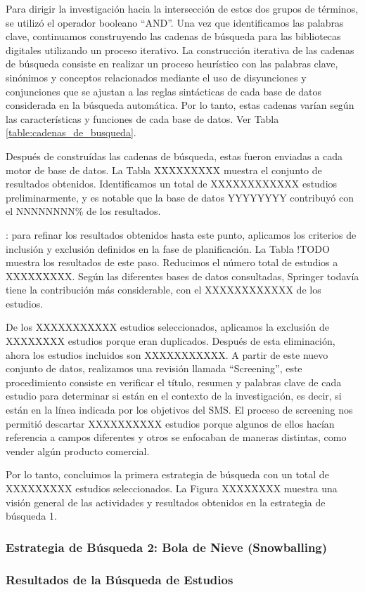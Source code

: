 Para dirigir la investigación hacia la intersección de estos dos grupos de términos, se utilizó el operador booleano ``AND''. Una vez que identificamos las palabras clave, continuamos construyendo las cadenas de búsqueda para las bibliotecas digitales utilizando un proceso iterativo. La construcción iterativa de las cadenas de búsqueda consiste en realizar un proceso heurístico con las palabras clave, sinónimos y conceptos relacionados mediante el uso de disyunciones y conjunciones que se ajustan a las reglas sintácticas de cada base de datos considerada en la búsqueda automática. Por lo tanto, estas cadenas varían según las características y funciones de cada base de datos. Ver Tabla \ref{table:cadenas_de_busqueda}.

Después de construídas las cadenas de búsqueda, estas fueron enviadas a cada motor de base de datos. La Tabla XXXXXXXXX  muestra el conjunto de resultados obtenidos. Identificamos un total de XXXXXXXXXXXX estudios preliminarmente, y es notable que la base de datos  YYYYYYYY contribuyó con el NNNNNNNN\% de los resultados.




: para refinar los resultados obtenidos hasta este punto, aplicamos los criterios de inclusión y exclusión definidos en la fase de planificación. La Tabla !TODO muestra los resultados de este paso. Reducimos el número total de estudios a XXXXXXXXX. Según las diferentes bases de datos consultadas, Springer todavía tiene la contribución más considerable, con el XXXXXXXXXXXX de los estudios.

De los XXXXXXXXXXX estudios seleccionados, aplicamos la exclusión de XXXXXXXX estudios porque eran duplicados. Después de esta eliminación, ahora los estudios incluidos son XXXXXXXXXXX. A partir de este nuevo conjunto de datos, realizamos una revisión llamada ``Screening'', este procedimiento consiste en verificar el título, resumen y palabras clave de cada estudio para determinar si están en el contexto de la investigación, es decir, si están en la línea indicada por los objetivos del SMS. El proceso de screening nos permitió descartar XXXXXXXXXX estudios porque algunos de ellos hacían referencia a campos diferentes y otros se enfocaban de maneras distintas, como vender algún producto comercial.

Por lo tanto, concluimos la primera estrategia de búsqueda con un total de XXXXXXXXX estudios seleccionados. La Figura XXXXXXXX muestra una visión general de las actividades y resultados obtenidos en la estrategia de búsqueda 1.

\subsubsection{Estrategia de Búsqueda 2: Bola de Nieve (Snowballing)}


\subsubsection{Resultados de la Búsqueda de Estudios}\label{subsubsec:resultados-busqueda}
